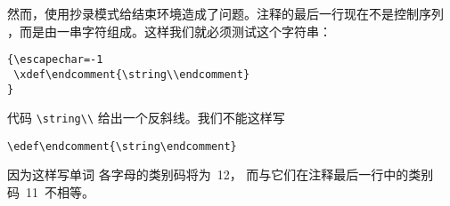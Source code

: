 \documentclass[letterpaper]{book}
\begin{document}
然而，使用抄录模式给结束环境造成了问题。注释的最后一行现在不是控制序列
，而是由一串字符组成。这样我们就必须测试这个字符串：
\begin{verbatim}
{\escapechar=-1
 \xdef\endcomment{\string\\endcomment}
}
\end{verbatim}
代码 \verb>\string\\> 给出一个反斜线。我们不能这样写
\begin{verbatim}
\edef\endcomment{\string\endcomment}
\end{verbatim}
因为这样写单词  各字母的类别码将为~12，
而与它们在注释最后一行中的类别码~11~不相等。

\endofchapter
\end{document}
